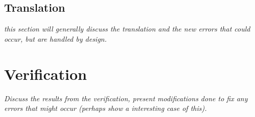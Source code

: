 \subsection{Translation}

\textit{this section will generally discuss the translation and the new errors that could occur, but are handled by design.}





\section{Verification}

\textit{Discuss the results from the verification, present modifications done to fix any errors that might occur (perhaps show a interesting case of this).}


